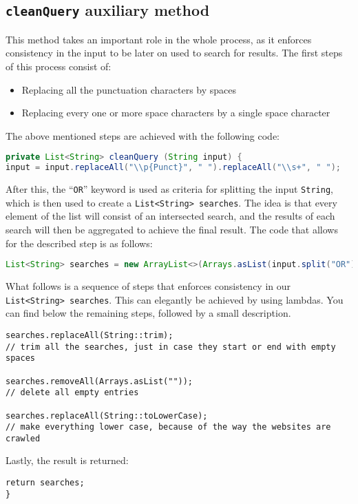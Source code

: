 \subsection{{\tt cleanQuery} auxiliary method}
This method takes an important role in the whole process, as it enforces consistency in the input to be later on used to search for results. The first steps of this process consist of:
\begin{itemize}
\item Replacing all the punctuation characters by spaces
\item Replacing every one or more space characters by a single space character
\end{itemize}
The above mentioned steps are achieved with the following code:
\begin{lstlisting}[language=Java]
private List<String> cleanQuery (String input) {
input = input.replaceAll("\\p{Punct}", " ").replaceAll("\\s+", " ");
\end{lstlisting}
After this, the ``{\tt OR}'' keyword is used as criteria for splitting the input {\tt String}, which is then used to create a {\tt List<String> searches}. The idea is that every element of the list will consist of an intersected search, and the results of each search will then be aggregated to achieve the final result. The code that allows for the described step is as follows:
\begin{lstlisting}[language=Java]
List<String> searches = new ArrayList<>(Arrays.asList(input.split("OR")));
\end{lstlisting}
What follows is a sequence of steps that enforces consistency in our {\tt List<String> searches}. This can elegantly be achieved by using lambdas. You can find below the remaining steps, followed by a small description.
\begin{lstlisting}
searches.replaceAll(String::trim);
// trim all the searches, just in case they start or end with empty spaces

searches.removeAll(Arrays.asList(""));
// delete all empty entries

searches.replaceAll(String::toLowerCase);
// make everything lower case, because of the way the websites are crawled
\end{lstlisting}
Lastly, the result is returned:
\begin{lstlisting}
return searches;
}
\end{lstlisting}

